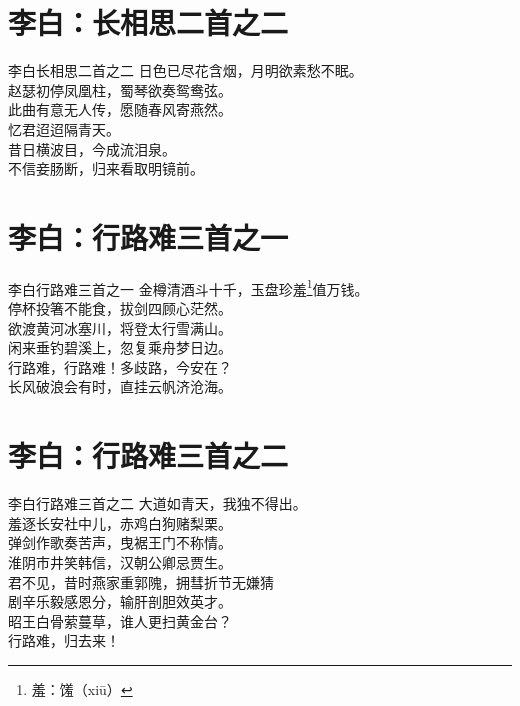 \documentclass[12pt,oneside,a5paper]{book}
\begin{document}
\chapter{李白：长相思二首之二}
\begin{poemzh}{李白}{长相思二首之二}
日色已尽花含烟，月明欲素愁不眠。\\
赵瑟初停凤凰柱，蜀琴欲奏鸳鸯弦。\\
此曲有意无人传，愿随春风寄燕然。\\
忆君迢迢隔青天。\\
昔日横波目，今成流泪泉。\\
不信妾肠断，归来看取明镜前。\\ 
\end{poemzh}

\chapter{李白：行路难三首之一}
\begin{poemzh}{李白}{行路难三首之一}
金樽清酒斗十千，玉盘珍羞\footnote[1]{羞：馐（xiū）}值万钱。\\
停杯投箸不能食，拔剑四顾心茫然。\\
欲渡黄河冰塞川，将登太行雪满山。\\
闲来垂钓碧溪上，忽复乘舟梦日边。\\
行路难，行路难！多歧路，今安在？\\
长风破浪会有时，直挂云帆济沧海。\\ 
\end{poemzh}


\chapter{李白：行路难三首之二}
\begin{poemzh}{李白}{行路难三首之二}
大道如青天，我独不得出。\\
羞逐长安社中儿，赤鸡白狗赌梨栗。\\
弹剑作歌奏苦声，曳裾王门不称情。\\
淮阴市井笑韩信，汉朝公卿忌贾生。\\
君不见，昔时燕家重郭隗，拥彗折节无嫌猜\\
剧辛乐毅感恩分，输肝剖胆效英才。\\
昭王白骨萦蔓草，谁人更扫黄金台？\\
行路难，归去来！\\ 
\end{poemzh}
\end{document}
